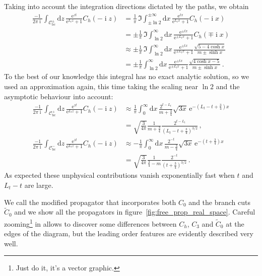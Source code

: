 \documentclass[a4paper]{article}
\DeclareMathOperator{\im}{i}
\newcommand{\eto}[1]{\ensuremath{\mathrm{e}^{#1}}}
\newcommand{\md}{\ensuremath{\mathrm{d}}}
\begin{document}
	Taking into account the integration directions dictated by the paths, we obtain
	\begin{align}
		\frac{-1}{2\pi\im}\int_{\mathcal{C}_\text{bc}^\pm}\md z\, \frac{\eto{z t}}{\eto{L_t z}+1}C_h(-\im z)
		&= \frac1\pi\,\Im\int_{\pm\ln2}^{\pm\infty}\md x\, \frac{\eto{t x}}{\eto{L_t x}+1}C_h(-\im x)\\
		&= \pm\frac1\pi\,\Im\int_{\ln2}^{\infty}\md x\, \frac{\eto{\pm t x}}{\eto{\pm L_t x}+1}C_h(\mp\im x)\\
		&\approx \pm\frac1\pi\,\Im\int_{\ln2}^{\infty}\md x\, \frac{\eto{\pm t x}}{\eto{\pm L_t x}+1}\frac{\sqrt{5-4 \cosh x}}{m\pm\sinh x}\\
		&= \pm\frac1\pi\int_{\ln2}^{\infty}\md x\, \frac{\eto{\pm t x}}{\eto{\pm L_t x}+1}\frac{\sqrt{4 \cosh x-5}}{m\pm\sinh x}\,.
	\end{align}
	To the best of our knowledge this integral has no exact analytic solution, so we used an approximation again, this time taking the scaling near $\ln2$ and the asymptotic behaviour into account:
	\begin{align}
		\frac{-1}{2\pi\im}\int_{\mathcal{C}_\text{bc}^+}\md z\, \frac{\eto{z t}}{\eto{L_t z}+1}C_h(-\im z)
		&\approx \frac1\pi\int_{0}^{\infty}\md x\,\frac{2^{t-L_t}}{m+\frac{3}{4}}\sqrt{3x}\,\eto{-\left(L_t-t+\frac{3}{4}\right) x}\\
		&=\sqrt{\frac3{4\pi}}\frac{1}{m+\frac34}\frac{2^{t-L_t}}{\left(L_t-t+\frac34\right)^{3/2}}\,,\\
		\frac{-1}{2\pi\im}\int_{\mathcal{C}_\text{bc}^-}\md z\, \frac{\eto{z t}}{\eto{L_t z}+1}C_h(-\im z)
		&\approx -\frac1\pi\int_{0}^{\infty}\md x\,\frac{2^{-t}}{m-\frac{3}{4}}\sqrt{3x}\,\eto{-\left(t+\frac{3}{4}\right) x}\\
		&=\sqrt{\frac3{4\pi}}\frac{1}{\frac34-m}\frac{2^{-t}}{\left(t+\frac34\right)^{3/2}}\,.
	\end{align}
	As expected these unphysical contributions vanish exponentially fast when $t$ and $L_t-t$ are large.
	
	We call the modified propagator that incorporates both $C_0$ and the branch cuts $\tilde C_0$ and we show all the propagators in figure~\ref{fig:free_prop_real_space}. Careful zooming\footnote{Just do it, it's a vector graphic.} in allows to discover some differences between $C_h$, $C_3$ and $\tilde C_0$ at the edges of the diagram, but the leading order features are evidently described very well.
	
\end{document}
